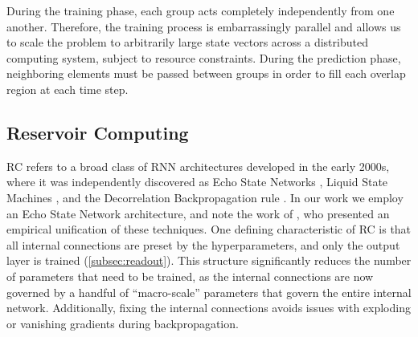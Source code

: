 During the training phase, each group acts completely independently from one
another.
Therefore, the training process is embarrassingly parallel and allows us to
scale the problem to arbitrarily large state vectors across a distributed
computing system, subject to resource constraints.
During the prediction phase, neighboring elements must be passed between
groups in order to fill each overlap region at each time step.


\subsection{Reservoir Computing}
\label{subsec:rc}
RC refers to a broad class of RNN architectures developed in the early
2000s, where it was independently discovered as
Echo State Networks \citep{jaeger_echo_2001},
Liquid State Machines \citep{maass_real-time_2002},
and the Decorrelation Backpropagation rule
\citep{steil_backpropagation-decorrelation_2004}.
In our work we employ an Echo State Network architecture, and note the work of
\citet{verstraeten_experimental_2007}, who presented an empirical unification of
these techniques.
One defining characteristic of RC is that all internal connections are
preset by the hyperparameters, and only the output layer is trained
(\cref{subsec:readout}).
This structure significantly reduces the number of parameters that need to be
trained, as the internal connections are now governed by a handful of
``macro-scale'' parameters that govern the entire internal network.
Additionally, fixing the internal connections avoids issues with exploding
or vanishing gradients during backpropagation.

